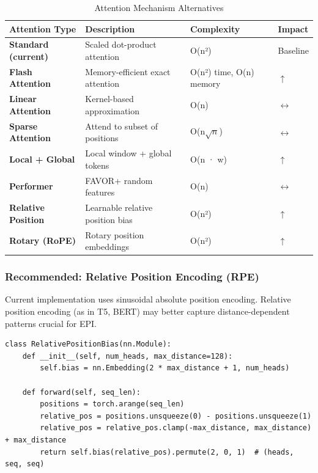 \documentclass[11pt,a4paper]{article}
\begin{document}
\begin{longtable}{L{3cm}L{4cm}L{4cm}C{1.5cm}}
\caption{Attention Mechanism Alternatives} \\
\toprule
\textbf{Attention Type} & \textbf{Description} & \textbf{Complexity} & \textbf{Impact} \\
\midrule
\endfirsthead
\bottomrule
\endlastfoot

\textbf{Standard (current)} & Scaled dot-product attention & O(n²) & Baseline \\

\textbf{Flash Attention} & Memory-efficient exact attention & O(n²) time, O(n) memory & \textcolor{positive}{$\uparrow$} \\

\textbf{Linear Attention} & Kernel-based approximation & O(n) & \textcolor{neutral}{$\leftrightarrow$} \\

\textbf{Sparse Attention} & Attend to subset of positions & O(n$\sqrt{n}$) & \textcolor{neutral}{$\leftrightarrow$} \\

\textbf{Local + Global} & Local window + global tokens & O(n · w) & \textcolor{positive}{$\uparrow$} \\

\textbf{Performer} & FAVOR+ random features & O(n) & \textcolor{neutral}{$\leftrightarrow$} \\

\textbf{Relative Position} & Learnable relative position bias & O(n²) & \textcolor{positive}{$\uparrow$} \\

\textbf{Rotary (RoPE)} & Rotary position embeddings & O(n²) & \textcolor{positive}{$\uparrow$} \\

\end{longtable}

\subsubsection{Recommended: Relative Position Encoding (RPE)}

Current implementation uses sinusoidal absolute position encoding. Relative position encoding (as in T5, BERT) may better capture distance-dependent patterns crucial for EPI.

\begin{verbatim}
class RelativePositionBias(nn.Module):
    def __init__(self, num_heads, max_distance=128):
        self.bias = nn.Embedding(2 * max_distance + 1, num_heads)
    
    def forward(self, seq_len):
        positions = torch.arange(seq_len)
        relative_pos = positions.unsqueeze(0) - positions.unsqueeze(1)
        relative_pos = relative_pos.clamp(-max_distance, max_distance) + max_distance
        return self.bias(relative_pos).permute(2, 0, 1)  # (heads, seq, seq)
\end{verbatim}
\end{document}
